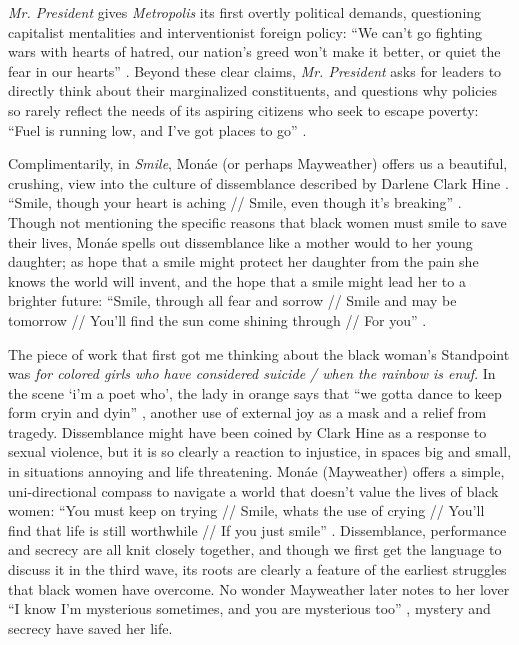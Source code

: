 \documentclass[a4paper, 11pt]{article} %
\begin{document}
\emph{Mr. President} gives \emph{Metropolis} its first overtly political demands, questioning capitalist mentalities and interventionist foreign policy: 
``We can't go fighting wars with hearts of hatred, our nation's greed won't make it better, or quiet the fear in our hearts'' \cite{mrpresident}.
Beyond these clear claims, \emph{Mr. President} asks for leaders to directly think about their marginalized constituents, and questions why policies so rarely reflect the needs of its aspiring citizens who seek to escape poverty:
``Fuel is running low, and I've got places to go'' \cite{mrpresident}.

Complimentarily, in \emph{Smile}, Mon\'ae (or perhaps Mayweather) offers us a beautiful, crushing, view into the culture of dissemblance described by Darlene Clark Hine \cite{hine}.
``Smile, though your heart is aching // Smile, even though it's breaking'' \cite{smile}.
Though not mentioning the specific reasons that black women must smile to save their lives, Mon\'ae spells out dissemblance like a mother would to her young daughter; as hope that a smile might protect her daughter from the pain she knows the world will invent, and the hope that a smile might lead her to a brighter future:
``Smile, through all fear and sorrow // Smile and may be tomorrow // You'll find the sun come shining through // For you'' \cite{smile}.

The piece of work that first got me thinking about the black woman's Standpoint was \emph{for colored girls who have considered suicide / when the rainbow is enuf}.
In the scene `i'm a poet who', the lady in orange says that ``we gotta dance to keep form cryin and dyin'' \cite{forcoloredgirls}, another use of external joy as a mask and a relief from tragedy.
Dissemblance might have been coined by Clark Hine as a response to sexual violence, but it is so clearly a reaction to injustice, in spaces big and small, in situations annoying and life threatening.
Mon\'ae (Mayweather) offers a simple, uni-directional compass to navigate a world that doesn't value the lives of black women:
``You must keep on trying // Smile, whats the use of crying // You'll find that life is still worthwhile // If you just smile'' \cite{smile}.
Dissemblance, performance and secrecy are all knit closely together, and though we first get the language to discuss it in the third wave, its roots are clearly a feature of the earliest struggles that black women have overcome.
No wonder Mayweather later notes to her lover ``I know I'm mysterious sometimes, and you are mysterious too'' \cite{primetime},
mystery and secrecy have saved her life.
\end{document}
